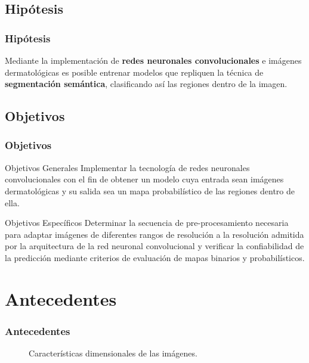 \documentclass{beamer}
\begin{document}
\subsection{Hipótesis}
\begin{frame}
    \frametitle{Hipótesis}
    Mediante la implementación de \textbf{redes neuronales convolucionales} e imágenes dermatológicas es posible entrenar modelos que repliquen la técnica de \textbf{segmentación semántica}, clasificando así las regiones dentro de la imagen. 
\end{frame}

\subsection{Objetivos}
\begin{frame}
    \frametitle{Objetivos}
    \begin{block}{Objetivos Generales}
        Implementar la tecnología de redes neuronales convolucionales con el fin de obtener un modelo cuya entrada sean imágenes dermatológicas y su salida sea un mapa probabilístico de las regiones dentro de ella.
        
    \end{block}
    \begin{block}{Objetivos Específicos}
        Determinar la secuencia de pre-procesamiento necesaria para adaptar imágenes de diferentes rangos de resolución a la resolución admitida por la arquitectura de la red neuronal convolucional y verificar la confiabilidad de la predicción mediante criterios de evaluación de mapas binarios y probabilísticos.
        
    \end{block}
\end{frame}

\section{Antecedentes}


\begin{frame}
\frametitle{Antecedentes}
    \begin{figure}
        \centering
         \qquad
        \caption{Características dimensionales de las imágenes.}
    \end{figure}
\end{frame}
\end{document}
